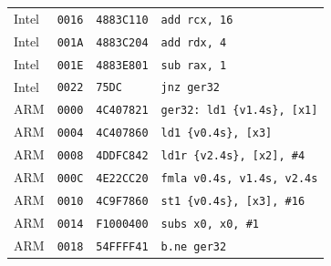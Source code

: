 \begin{table}[htbp]
\begin{tabular}{@{}l|l|l|p{7.2cm}@{}}
Intel & \texttt{0016} & \texttt{4883C110} & \texttt{add rcx, 16} \\
Intel & \texttt{001A} & \texttt{4883C204} & \texttt{add rdx, 4} \\
Intel & \texttt{001E} & \texttt{4883E801} & \texttt{sub rax, 1} \\
Intel & \texttt{0022} & \texttt{75DC} & \texttt{jnz ger32} \\
\midrule
ARM & \texttt{0000} & \texttt{4C407821} & \texttt{ger32: ld1 \{v1.4s\}, [x1]} \\
ARM & \texttt{0004} & \texttt{4C407860} & \texttt{ld1 \{v0.4s\}, [x3]} \\
ARM & \texttt{0008} & \texttt{4DDFC842} & \texttt{ld1r \{v2.4s\}, [x2], \#4} \\
ARM & \texttt{000C} & \texttt{4E22CC20} & \texttt{fmla v0.4s, v1.4s, v2.4s} \\
ARM & \texttt{0010} & \texttt{4C9F7860} & \texttt{st1 \{v0.4s\}, [x3], \#16} \\
ARM & \texttt{0014} & \texttt{F1000400} & \texttt{subs x0, x0, \#1} \\
ARM & \texttt{0018} & \texttt{54FFFF41} & \texttt{b.ne ger32} \\
\bottomrule
\end{tabular}
\endgroup
\end{table}
\noindent{}\par
